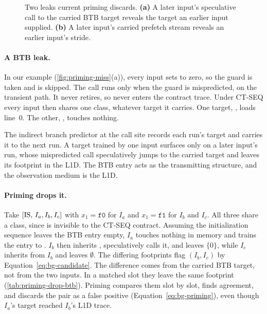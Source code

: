\begin{figure}[t]
\centering
\fitwidth{}
\caption{Two leaks current priming discards. \textbf{(a)} A later input's speculative call to the
carried BTB target reveals the target an earlier input supplied. \textbf{(b)} A later input's
carried prefetch stream reveals an earlier input's stride.}
\label{fig:priming-miss}
\end{figure}

\paragraph{A BTB leak.}
In our example (\autoref{fig:priming-miss}(a)), every input sets  to zero, so the guard
 is taken and  is skipped. The call runs only when the guard is
mispredicted, on the transient path. It never retires, so  never enters the contract
trace. Under \textsc{CT-SEQ} every input then shares one class, whatever target it carries. One
target, , loads line~$0$. The other, , touches nothing.

The indirect branch predictor at the call site records each run's target and carries it to the
next run. A target trained by one input surfaces only on a later input's run, whose mispredicted
call speculatively jumps to the carried target and leaves its footprint in the L1D. The BTB entry
acts as the transmitting structure, and the observation medium is the L1D.

\paragraph{Priming drops it.}
Take $[\mathrm{IS},\,I_a,I_b,I_c]$ with $x_1=\texttt{f0}$ for $I_a$ and $x_1=\texttt{f1}$ for $I_b$ and
$I_c$. All three share a class, since  is invisible to the \textsc{CT-SEQ} contract.
Assuming the initialization sequence leaves the BTB entry empty, $I_a$ touches nothing in memory
and trains the entry to . $I_b$ then inherits , speculatively calls it, and leaves
$\{0\}$, while $I_c$ inherits  from $I_b$ and leaves $\emptyset$. The differing footprints
flag $(I_b,I_c)$ by Equation~\eqref{eq:bg-candidate}. The difference comes from the carried BTB
target, not from the two inputs. In a matched slot they leave the same footprint
(\autoref{tab:priming-drop-btb}). Priming compares them slot by slot, finds agreement, and discards
the pair as a false positive (Equation~\eqref{eq:bg-priming}), even though $I_a$'s target reached $I_b$'s L1D trace.

